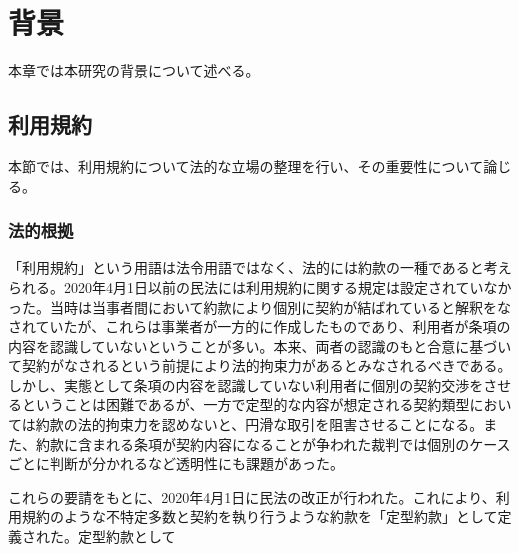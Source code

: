 \chapter{背景}
\label{background}
本章では本研究の背景について述べる。

\section{利用規約}
本節では、利用規約について法的な立場の整理を行い、その重要性について論じる。

\subsection{法的根拠}
「利用規約」という用語は法令用語ではなく、法的には約款の一種であると考えられる\cite{itakura2013}。2020年4月1日以前の民法には利用規約に関する規定は設定されていなかった。当時は当事者間において約款により個別に契約が結ばれていると解釈をなされていたが、これらは事業者が一方的に作成したものであり、利用者が条項の内容を認識していないということが多い。本来、両者の認識のもと合意に基づいて契約がなされるという前提により法的拘束力があるとみなされるべきである。しかし、実態として条項の内容を認識していない利用者に個別の契約交渉をさせるということは困難であるが、一方で定型的な内容が想定される契約類型においては約款の法的拘束力を認めないと、円滑な取引を阻害させることになる。また、約款に含まれる条項が契約内容になることが争われた裁判では個別のケースごとに判断が分かれるなど透明性にも課題があった\cite{hashimoto2021}。

これらの要請をもとに、2020年4月1日に民法の改正が行われた\cite{moj2020minpo}。これにより、利用規約のような不特定多数と契約を執り行うような約款を「定型約款」として定義された。定型約款として



